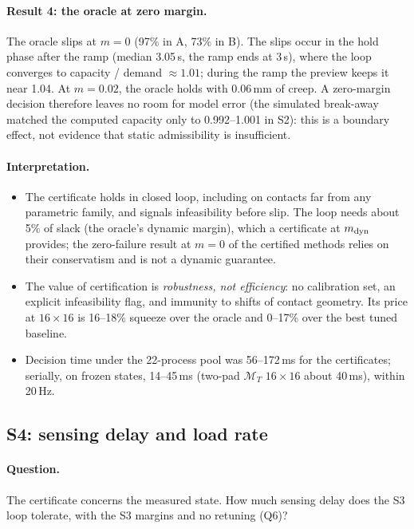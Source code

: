 \documentclass[11pt,a4paper]{article}
\newcommand{\M}{\mathcal M}
\begin{document}
\paragraph{Result 4: the oracle at zero margin.} The oracle slips at $m=0$ (97\% in A, 73\% in B). The slips occur in the hold phase after the ramp
(median 3.05\,s, the ramp ends at 3\,s), where the loop converges to capacity / demand $\approx1.01$; during the ramp the preview keeps it near
1.04. At $m=0.02$, the oracle holds with 0.06\,mm of creep. A zero-margin decision therefore leaves no room for model error (the simulated break-away
matched the computed capacity only to 0.992--1.001 in S2): this is a boundary effect, not evidence that static admissibility is insufficient.

\paragraph{Interpretation.}
\begin{itemize}
    \item The certificate holds in closed loop, including on contacts far from any parametric family, and signals infeasibility before slip. The
    loop needs about 5\% of slack (the oracle's dynamic margin), which a certificate at $m_{\rm dyn}$ provides; the zero-failure result at $m=0$ of
    the certified methods relies on their conservatism and is not a dynamic guarantee.
    \item The value of certification is \emph{robustness, not efficiency}: no calibration set, an explicit infeasibility flag, and immunity to
    shifts of contact geometry. Its price at $16\times16$ is 16--18\% squeeze over the oracle and 0--17\% over the best tuned baseline.
    \item Decision time under the 22-process pool was 56--172\,ms for the certificates; serially, on frozen states, 14--45\,ms (two-pad $\M_T$
    $16\times16$ about 40\,ms), within 20\,Hz.
\end{itemize}

\subsection{S4: sensing delay and load rate}
\label{sec:S4}
\paragraph{Question.} The certificate concerns the measured state. How much sensing delay does the S3 loop tolerate, with the S3 margins and no
retuning (Q6)?
\end{document}

